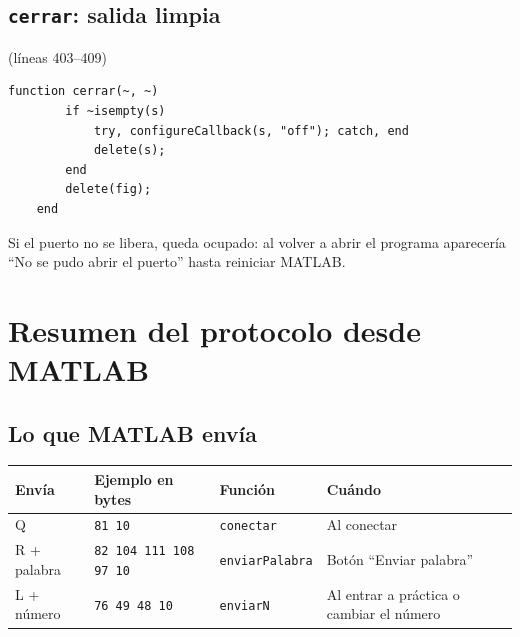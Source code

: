 \documentclass[11pt,a4paper]{article}
\newcommand{\linea}[1]{\textcolor{gris}{\small(líneas #1)}}
\newcommand{\cod}[1]{\texttt{#1}}
\begin{document}
\subsection{\texttt{cerrar}: salida limpia}
\linea{403--409}
\begin{lstlisting}[firstnumber=403]
    function cerrar(~, ~)
        if ~isempty(s)
            try, configureCallback(s, "off"); catch, end
            delete(s);
        end
        delete(fig);
    end
\end{lstlisting}
\begin{ojo}
Si el puerto no se libera, queda ocupado: al volver a abrir el programa
aparecería ``No se pudo abrir el puerto'' hasta reiniciar MATLAB.
\end{ojo}

\section{Resumen del protocolo desde MATLAB}

\subsection{Lo que MATLAB envía}
\begin{center}
\begin{tabular}{>{\ttfamily}l l l >{\raggedright\arraybackslash}p{4.2cm}}
\toprule
\normalfont\textbf{Envía} & \textbf{Ejemplo en bytes} & \textbf{Función} & \textbf{Cuándo} \\
\midrule
Q & \cod{81 10} & \cod{conectar} & Al conectar \\
R + palabra & \cod{82 104 111 108 97 10} & \cod{enviarPalabra} & Botón ``Enviar palabra'' \\
L + número & \cod{76 49 48 10} & \cod{enviarN} & Al entrar a práctica o cambiar el número \\
\bottomrule
\end{tabular}
\end{center}
\end{document}
